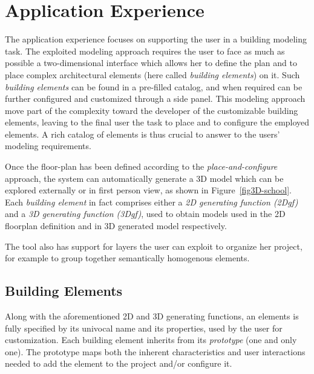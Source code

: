 \section{Application Experience}\label{sec:application}

The application experience focuses on supporting the user in a building modeling task. The exploited modeling approach requires the user to face as much as possible a two-dimensional interface which allows her to define the plan and to place complex architectural elements (here called \emph{building elements}) on it. Such \emph{building elements} can be found in a pre-filled catalog, and when required can be further configured and customized through a side panel. This modeling approach move part of the complexity toward the developer of the customizable building elements, leaving to the final user the task to place and to configure the employed elements. A rich catalog of elements is thus crucial to answer to the users' modeling requirements.

Once the floor-plan has been defined according to the \emph{place-and-configure} approach, the system can automatically generate a 3D model which can be explored externally or in first person view, as shown in Figure~\ref{fig3D-school}. Each  \emph{building element} in fact comprises either a \emph{2D generating function (2Dgf)} and a \emph{3D generating function (3Dgf)}, used to obtain models used in the 2D floorplan definition and in 3D generated model respectively.

The tool also has support for layers the user can exploit to organize her project, for example to group together semantically homogenous elements.

\subsection{Building Elements}\label{ssec:elements}

Along with the aforementioned 2D and 3D generating functions, an elements is fully specified by its univocal name and its properties, used by the user for customization. Each building element inherits from its \emph{prototype} (one and only one). The prototype maps both the inherent characteristics and user interactions needed to add the element to the project and/or configure it.

